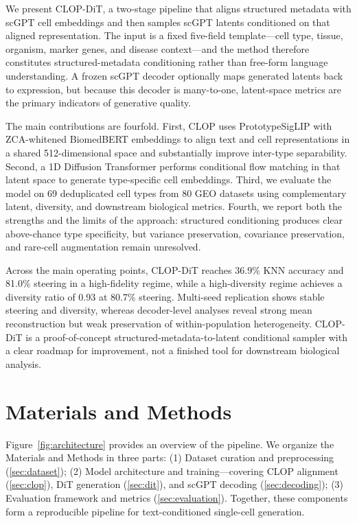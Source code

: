 \documentclass[preprint,12pt]{elsarticle}
\begin{document}
We present CLOP-DiT, a two-stage pipeline that aligns structured metadata with scGPT cell embeddings and then samples scGPT latents conditioned on that aligned representation. The input is a fixed five-field template---cell type, tissue, organism, marker genes, and disease context---and the method therefore constitutes structured-metadata conditioning rather than free-form language understanding. A frozen scGPT decoder optionally maps generated latents back to expression, but because this decoder is many-to-one, latent-space metrics are the primary indicators of generative quality.

The main contributions are fourfold. First, CLOP uses PrototypeSigLIP with ZCA-whitened BiomedBERT embeddings to align text and cell representations in a shared 512-dimensional space and substantially improve inter-type separability. Second, a 1D Diffusion Transformer performs conditional flow matching in that latent space to generate type-specific cell embeddings. Third, we evaluate the model on 69 deduplicated cell types from 80 GEO datasets using complementary latent, diversity, and downstream biological metrics. Fourth, we report both the strengths and the limits of the approach: structured conditioning produces clear above-chance type specificity, but variance preservation, covariance preservation, and rare-cell augmentation remain unresolved.

Across the main operating points, CLOP-DiT reaches 36.9\% KNN accuracy and 81.0\% steering in a high-fidelity regime, while a high-diversity regime achieves a diversity ratio of 0.93 at 80.7\% steering. Multi-seed replication shows stable steering and diversity, whereas decoder-level analyses reveal strong mean reconstruction but weak preservation of within-population heterogeneity. CLOP-DiT is a proof-of-concept structured-metadata-to-latent conditional sampler with a clear roadmap for improvement, not a finished tool for downstream biological analysis.

\section{Materials and Methods}

Figure~\ref{fig:architecture} provides an overview of the pipeline.
We organize the Materials and Methods in three parts:
(1) Dataset curation and preprocessing (\ref{sec:dataset});
(2) Model architecture and training---covering CLOP alignment (\ref{sec:clop}),
DiT generation (\ref{sec:dit}), and scGPT decoding (\ref{sec:decoding});
(3) Evaluation framework and metrics (\ref{sec:evaluation}).
Together, these components form a reproducible pipeline for text-conditioned single-cell generation.
\end{document}
